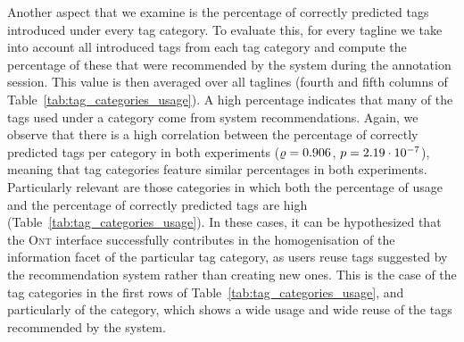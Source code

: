 Another aspect that we examine is the percentage of correctly predicted tags introduced under every tag category. To evaluate this, for every tagline we take into account all introduced tags from each tag category and compute the percentage of these that were recommended by the system during the annotation session. This value is then averaged over all taglines (fourth and fifth columns of Table~\ref{tab:tag_categories_usage}). A high percentage indicates that many of the tags used under a category come from system recommendations. %
Again, we observe that there is a high correlation between the percentage of correctly predicted tags per category in both experiments ($\varrho=0.906$, $p = 2.19\cdot 10^{-7}$), meaning that tag categories feature similar percentages in both experiments.
Particularly relevant are those categories in which both the percentage of usage and the percentage of correctly predicted tags are high (Table~\ref{tab:tag_categories_usage}). In these cases, it can be hypothesized that the \textsc{Ont} interface successfully contributes in the homogenisation of the information facet of the particular tag category, as users reuse tags suggested by the recommendation system rather than creating new ones.
This is the case of the tag categories in the first rows of Table~\ref{tab:tag_categories_usage}, and particularly of the  category, which shows a wide usage and wide reuse of the tags recommended by the system.


